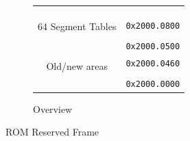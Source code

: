\documentclass[12pt,a4paper,openright,twoside]{report}
\begin{document}
\begin{figure}[h]
\begin{subfigure}[b]{0.4\textwidth}
\begin{tabular}{cl}
			\multicolumn{1}{|c|}{\multirow{4}{*}{\cellcolor{gray}}}               &                                       \\ [3ex]
			\multicolumn{1}{|c|}{\cellcolor{gray}}                                &                                       \\
			\multicolumn{1}{|c|}{\cellcolor{gray}}                                &                                       \\
			\multicolumn{1}{|c|}{\cellcolor{gray}}                                & \multirow{2}{*}{\texttt{0x2000.0800}} \\ \cline{1-1}
			\multicolumn{1}{|c|}{\multirow{4}{*}{64 Segment Tables}}              &                                       \\ [-1ex]
			\multicolumn{1}{|c|}{}                                                & \multirow{2}{*}{}                     \\
			\multicolumn{1}{|c|}{}                                                &                                       \\
			\multicolumn{1}{|c|}{}                                                & \multirow{2}{*}{\texttt{0x2000.0500}} \\ \hhline{-~}
			\multicolumn{1}{|c|}{\multirow{2}{*}{\cellcolor{gray}}}               &                                       \\ [-2ex]
			\multicolumn{1}{|c|}{\cellcolor{gray}}                                & \multirow{2}{*}{\texttt{0x2000.0460}} \\ \cline{1-1}
			\multicolumn{1}{|c|}{\multirow{4}{*}{Old/new areas}}                  &                                       \\
			\multicolumn{1}{|c|}{}                                                & \multirow{2}{*}{}                     \\
			\multicolumn{1}{|c|}{}                                                &                                       \\
			\multicolumn{1}{|c|}{}                                                & \multirow{2}{*}{\texttt{0x2000.0000}} \\ \cline{1-1}
			                                                                      &
		\end{tabular}
		\caption{Overview}
		\label{fig:rom_reserved_frame_overview}
	\end{subfigure}
	\caption{ROM Reserved Frame}
	\label{fig:rom_reserved_frame}
\end{figure}
\end{document}
